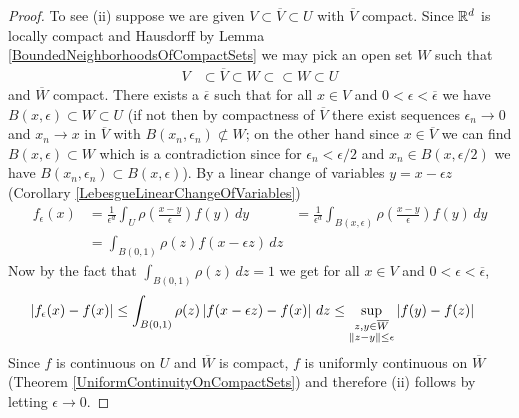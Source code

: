 \begin{proof}
To see (ii) suppose we are given $V \subset \overline{V}  \subset U$ with $\overline{V}$ compact.  Since $\mathbb{R}^d$ is locally compact and Hausdorff  by Lemma \ref{BoundedNeighborhoodsOfCompactSets}  we may pick an open set $W$ such
that 
\begin{align*}
V &\subset \overline{V} \subset W \subset \subset{W} \subset U
\end{align*}
and $\overline{W}$ compact.
There exists a $\overline{\epsilon}$ such that for all $x \in V$ and $0<\epsilon<\overline{\epsilon}$ we have $B(x, \epsilon) \subset W \subset U$ (if not then by compactness of $\overline{V}$ there exist sequences $\epsilon_n \to 0$ and $x_n \to x$ in $\overline{V}$ with $B(x_n, \epsilon_n) \not \subset W$;  on the other hand since $x \in \overline{V}$ we can find $B(x,\epsilon) \subset W$ which is a contradiction since for $\epsilon_n < \epsilon/2$ and $x_n \in B(x,\epsilon/2)$ we have $B(x_n,\epsilon_n) \subset B(x,\epsilon)$).    By a linear change of variables $y = x-\epsilon z$ (Corollary \ref{LebesgueLinearChangeOfVariables})
\begin{align*}
f_\epsilon(x) &= \frac{1}{\epsilon^d} \int_U \rho(\frac{x-y}{\epsilon}) f(y) \, dy &= \frac{1}{\epsilon^d} \int_{B(x,\epsilon)} \rho(\frac{x-y}{\epsilon}) f(y) \, dy \\
&= \int_{B(0,1)} \rho(z) f(x-\epsilon z) \, dz 
\end{align*}
Now by the fact that $\int_{B(0,1)} \rho(z) \, dz=1$ we get for all $x \in V$ and $0 < \epsilon < \overline{\epsilon}$,
\begin{align*}
\left \vert f_\epsilon(x) - f(x) \right \vert &\leq \int_{B(0,1)} \rho(z) \left \vert f(x-\epsilon z) - f(x) \right \vert \, dz \leq \sup_{\substack{z,y \in \overline{W} \\ \left \lVert z-y \right \rVert \leq \epsilon}} \left \vert f(y) - f(z) \right \vert
\end{align*}
Since $f$ is continuous on $U$ and $\overline{W}$ is compact, $f$ is uniformly continuous on $\overline{W}$ (Theorem \ref{UniformContinuityOnCompactSets}) and therefore (ii) follows 
by letting $\epsilon \to 0$.


\end{proof}
